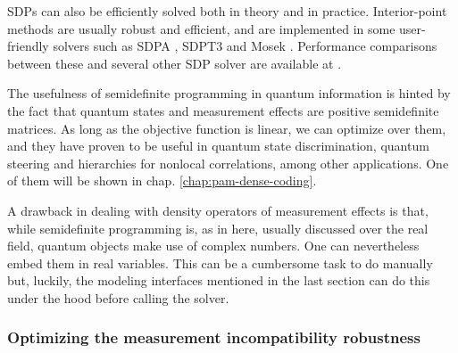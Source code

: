			SDPs can also be efficiently solved both in theory and in practice. Interior-point methods are usually robust and efficient, and are implemented in some user-friendly solvers such as SDPA \cite{}, SDPT3 \cite{} and Mosek \cite{}. Performance comparisons between these and several other SDP solver are available at \cite{http://plato.asu.edu/ftp/sparse_sdp.html}.

			The usefulness of semidefinite programming in quantum information is hinted by the fact that quantum states and measurement effects are positive semidefinite matrices. As long as the objective function is linear, we can optimize over them, and they have proven to be useful in quantum state discrimination, quantum steering and hierarchies for nonlocal correlations, among other applications. One of them will be shown in chap. \ref{chap:pam-dense-coding}.

			A drawback in dealing with density operators of measurement effects is that, while semidefinite programming is, as in here, usually discussed over the real field, quantum objects make use of complex numbers. One can nevertheless embed them in real variables. This can be a cumbersome task to do manually but, luckily, the modeling interfaces mentioned in the last section can do this under the hood before calling the solver.


			\subsubsection{Optimizing the measurement incompatibility robustness}
			\label{sec:incompatibility-robustness}
				\todo{}